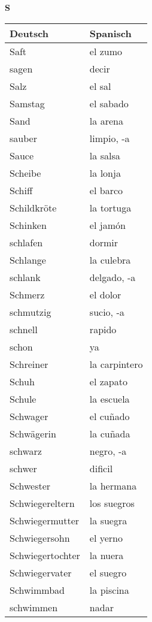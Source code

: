 \begin{flushright}\begin{Huge}\textbf{S}\end{Huge}\end{flushright}

\begin{longtable}{p{} p{}} 
\textbf{Deutsch}     & \textbf{Spanisch}                                       \\ \hline
\hline
\endhead %
Saft & el zumo\\
sagen & decir \\
Salz & el sal\\
Samstag & el sabado\\
Sand & la arena\\
sauber & limpio, -a\\
Sauce & la salsa\\
Scheibe & la lonja\\
Schiff & el barco\\
Schildkröte & la tortuga\\
Schinken & el jamón\\
schlafen & dormir\\
Schlange & la culebra\\
schlank & delgado, -a\\
Schmerz & el dolor\\
schmutzig & sucio, -a\\
schnell & rapido\\
schon & ya\\
Schreiner & la carpintero\\
Schuh & el zapato\\
Schule & la escuela\\
Schwager & el cuñado\\
Schwägerin & la cuñada\\
schwarz & negro, -a\\
schwer & dificil\\
Schwester & la hermana\\
Schwiegereltern & los suegros\\
Schwiegermutter & la suegra\\
Schwiegersohn & el yerno\\
Schwiegertochter & la nuera\\
Schwiegervater & el suegro\\
Schwimmbad & la piscina\\
schwimmen & nadar\\

\end{longtable}
